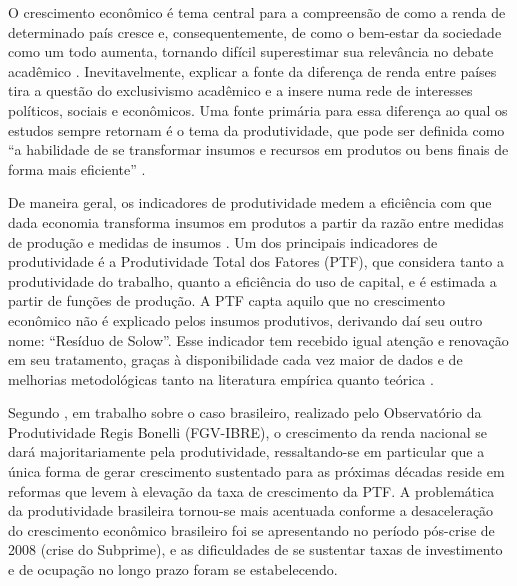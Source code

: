 \documentclass[
  12pt,
  a4paper,
  oneside,
  brazil,
  chapter=TITLE,
  section=TITLE
]{abntex2}
\begin{document}
O crescimento econômico é tema central para a compreensão de como a renda de determinado país cresce e, consequentemente, de como o bem-estar da sociedade como um todo aumenta, tornando difícil superestimar sua relevância no debate acadêmico \cite{jones2013}. Inevitavelmente, explicar a fonte da diferença de renda entre países tira a questão do exclusivismo acadêmico e a insere numa rede de interesses políticos, sociais e econômicos. Uma fonte primária para essa diferença ao qual os estudos sempre retornam é o tema da produtividade, que pode ser definida como ``a habilidade de se transformar insumos e recursos em produtos ou bens finais de forma mais eficiente'' \cite{tavares2001}.

De maneira geral, os indicadores de produtividade medem a eficiência com que dada economia transforma insumos em produtos a partir da razão entre medidas de produção e medidas de insumos \cite{denegri2014}. Um dos principais indicadores de produtividade é a Produtividade Total dos Fatores (PTF), que considera tanto a produtividade do trabalho, quanto a eficiência do uso de capital, e é estimada a partir de funções de produção. A PTF capta aquilo que no crescimento econômico não é explicado pelos insumos produtivos, derivando daí seu outro nome: ``Resíduo de Solow''. Esse indicador tem recebido igual atenção e renovação em seu tratamento, graças à disponibilidade cada vez maior de dados e de melhorias metodológicas tanto na literatura empírica quanto teórica \cite{vanbeveren2012}.

Segundo , em trabalho sobre o caso brasileiro, realizado pelo Observatório da Produtividade Regis Bonelli (FGV-IBRE), o crescimento da renda nacional se dará majoritariamente pela produtividade, ressaltando-se em particular que a única forma de gerar crescimento sustentado para as próximas décadas reside em reformas que levem à elevação da taxa de crescimento da PTF. A problemática da produtividade brasileira tornou-se mais acentuada conforme a desaceleração do crescimento econômico brasileiro foi se apresentando no período pós-crise de 2008 (crise do Subprime), e as dificuldades de se sustentar taxas de investimento e de ocupação no longo prazo foram se estabelecendo.
\end{document}
